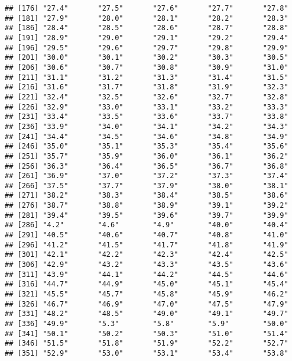 \documentclass[
]{article}
\begin{document}
\begin{verbatim}
## [176] "27.4"       "27.5"       "27.6"       "27.7"       "27.8"      
## [181] "27.9"       "28.0"       "28.1"       "28.2"       "28.3"      
## [186] "28.4"       "28.5"       "28.6"       "28.7"       "28.8"      
## [191] "28.9"       "29.0"       "29.1"       "29.2"       "29.4"      
## [196] "29.5"       "29.6"       "29.7"       "29.8"       "29.9"      
## [201] "30.0"       "30.1"       "30.2"       "30.3"       "30.5"      
## [206] "30.6"       "30.7"       "30.8"       "30.9"       "31.0"      
## [211] "31.1"       "31.2"       "31.3"       "31.4"       "31.5"      
## [216] "31.6"       "31.7"       "31.8"       "31.9"       "32.3"      
## [221] "32.4"       "32.5"       "32.6"       "32.7"       "32.8"      
## [226] "32.9"       "33.0"       "33.1"       "33.2"       "33.3"      
## [231] "33.4"       "33.5"       "33.6"       "33.7"       "33.8"      
## [236] "33.9"       "34.0"       "34.1"       "34.2"       "34.3"      
## [241] "34.4"       "34.5"       "34.6"       "34.8"       "34.9"      
## [246] "35.0"       "35.1"       "35.3"       "35.4"       "35.6"      
## [251] "35.7"       "35.9"       "36.0"       "36.1"       "36.2"      
## [256] "36.3"       "36.4"       "36.5"       "36.7"       "36.8"      
## [261] "36.9"       "37.0"       "37.2"       "37.3"       "37.4"      
## [266] "37.5"       "37.7"       "37.9"       "38.0"       "38.1"      
## [271] "38.2"       "38.3"       "38.4"       "38.5"       "38.6"      
## [276] "38.7"       "38.8"       "38.9"       "39.1"       "39.2"      
## [281] "39.4"       "39.5"       "39.6"       "39.7"       "39.9"      
## [286] "4.2"        "4.6"        "4.9"        "40.0"       "40.4"      
## [291] "40.5"       "40.6"       "40.7"       "40.8"       "41.0"      
## [296] "41.2"       "41.5"       "41.7"       "41.8"       "41.9"      
## [301] "42.1"       "42.2"       "42.3"       "42.4"       "42.5"      
## [306] "42.9"       "43.2"       "43.3"       "43.5"       "43.6"      
## [311] "43.9"       "44.1"       "44.2"       "44.5"       "44.6"      
## [316] "44.7"       "44.9"       "45.0"       "45.1"       "45.4"      
## [321] "45.5"       "45.7"       "45.8"       "45.9"       "46.2"      
## [326] "46.7"       "46.9"       "47.0"       "47.5"       "47.9"      
## [331] "48.2"       "48.5"       "49.0"       "49.1"       "49.7"      
## [336] "49.9"       "5.3"        "5.8"        "5.9"        "50.0"      
## [341] "50.1"       "50.2"       "50.3"       "51.0"       "51.4"      
## [346] "51.5"       "51.8"       "51.9"       "52.2"       "52.7"      
## [351] "52.9"       "53.0"       "53.1"       "53.4"       "53.8"      

\end{verbatim}
\end{document}
